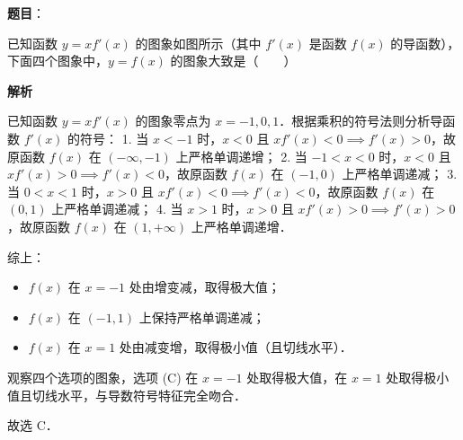 \begin{answer}

\textbf{题目}：

已知函数 $y = xf'(x)$ 的图象如图所示（其中 $f'(x)$ 是函数 $f(x)$ 的导函数），下面四个图象中，$y = f(x)$ 的图象大致是\mbox{（　　）}
\nopagebreak[4]
\begin{center}\end{center}
\nopagebreak[4]
\nopagebreak[4]
\begin{center}\end{center}
\nopagebreak[4]
\textbf{解析}

已知函数 $y = x f'(x)$ 的图象零点为 $x = -1, 0, 1$．根据乘积的符号法则分析导函数 $f'(x)$ 的符号：
1. 当 $x < -1$ 时，$x < 0$ 且 $x f'(x) < 0 \implies f'(x) > 0$，故原函数 $f(x)$ 在 $(-\infty, -1)$ 上严格单调递增；
2. 当 $-1 < x < 0$ 时，$x < 0$ 且 $x f'(x) > 0 \implies f'(x) < 0$，故原函数 $f(x)$ 在 $(-1, 0)$ 上严格单调递减；
3. 当 $0 < x < 1$ 时，$x > 0$ 且 $x f'(x) < 0 \implies f'(x) < 0$，故原函数 $f(x)$ 在 $(0, 1)$ 上严格单调递减；
4. 当 $x > 1$ 时，$x > 0$ 且 $x f'(x) > 0 \implies f'(x) > 0$，故原函数 $f(x)$ 在 $(1, +\infty)$ 上严格单调递增．

综上：
\begin{itemize}
\item $f(x)$ 在 $x = -1$ 处由增变减，取得极大值；
\item $f(x)$ 在 $(-1, 1)$ 上保持严格单调递减；
\item $f(x)$ 在 $x = 1$ 处由减变增，取得极小值（且切线水平）．
\end{itemize}
观察四个选项的图象，选项 (C) 在 $x = -1$ 处取得极大值，在 $x = 1$ 处取得极小值且切线水平，与导数符号特征完全吻合．

故选 C．


\end{answer}

